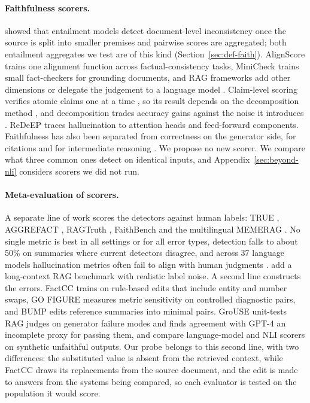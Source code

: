 \documentclass[11pt]{article}
\begin{document}
\paragraph{Faithfulness scorers.}
\citet{laban-etal-2022-summac} showed that entailment models detect document-level inconsistency once the source is split into smaller premises and pairwise scores are aggregated; both entailment aggregates we test are of this kind (Section~\ref{sec:def-faith}). AlignScore \citep{zha-etal-2023} trains one alignment function across factual-consistency tasks, MiniCheck \citep{tang-etal-2024} trains small fact-checkers for grounding documents, and RAG frameworks add other dimensions or delegate the judgement to a language model \citep{es-etal-2024,saad-falcon-etal-2024,tamber-etal-2025,murugaraj-etal-2026}. Claim-level scoring verifies atomic claims one at a time \citep{min-etal-2023-factscore}, so its result depends on the decomposition method \citep{wanner-etal-2024-closer}, and decomposition trades accuracy gains against the noise it introduces \citep{hu-etal-2025-decomposition}. ReDeEP \citep{sun-etal-2025} traces hallucination to attention heads and feed-forward components. Faithfulness has also been separated from correctness on the generator side, for citations \citep{wallat-etal-2025} and for intermediate reasoning \citep{xu-etal-2025}. We propose no new scorer. We compare what three common ones detect on identical inputs, and Appendix~\ref{sec:beyond-nli} considers scorers we did not run.

\paragraph{Meta-evaluation of scorers.}
A separate line of work scores the detectors against human labels: TRUE \citep{honovich-etal-2022}, AGGREFACT \citep{tang-etal-2023}, RAGTruth \citep{niu-etal-2024}, FaithBench \citep{bao-etal-2025} and the multilingual MEMERAG \citep{cruz-blandon-etal-2025-memerag}. No single metric is best in all settings or for all error types, detection falls to about 50\% on summaries where current detectors disagree, and across 37 language models hallucination metrics often fail to align with human judgments \citep{kulkarni-etal-2025-evaluating}. \citet{chen-etal-2026-rethinking-evaluation} add a long-context RAG benchmark with realistic label noise. A second line constructs the errors. FactCC \citep{kryscinski-etal-2020-evaluating} trains on rule-based edits that include entity and number swaps, GO FIGURE \citep{gabriel-etal-2021-go} measures metric sensitivity on controlled diagnostic pairs, and BUMP \citep{ma-etal-2023} edits reference summaries into minimal pairs. GroUSE \citep{muller-etal-2025-grouse} unit-tests RAG judges on generator failure modes and finds agreement with \mbox{GPT-4} an incomplete proxy for passing them, and \citet{jing-etal-2025-scale} compare language-model and NLI scorers on synthetic unfaithful outputs. Our probe belongs to this second line, with two differences: the substituted value is absent from the retrieved context, while FactCC draws its replacements from the source document, and the edit is made to answers from the systems being compared, so each evaluator is tested on the population it would score.
\end{document}
